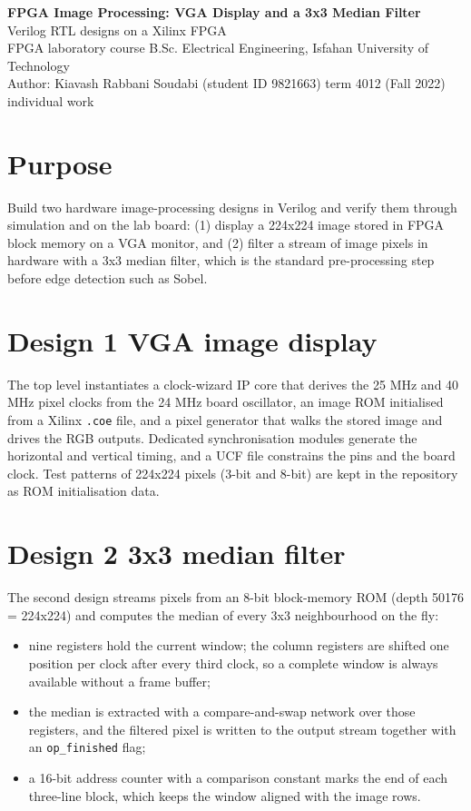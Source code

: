 \documentclass[10pt,a4paper]{article}
\begin{document}
\begin{center}
{\Large\bfseries FPGA Image Processing: VGA Display and a 3x3 Median Filter}\\[2pt]
{\large Verilog RTL designs on a Xilinx FPGA}\\[4pt]
{\small FPGA laboratory course \textendash{} B.Sc. Electrical Engineering, Isfahan University of Technology}\\
{\small Author: Kiavash Rabbani Soudabi (student ID 9821663) \textendash{} term 4012 (Fall 2022) \textendash{} individual work}
\end{center}

\section*{Purpose}
Build two hardware image-processing designs in Verilog and verify them through simulation and on the lab board:
(1) display a 224x224 image stored in FPGA block memory on a VGA monitor, and (2) filter a stream of image pixels in
hardware with a 3x3 median filter, which is the standard pre-processing step before edge detection such as Sobel.

\section*{Design 1 \textendash{} VGA image display}
The top level instantiates a clock-wizard IP core that derives the 25 MHz and 40 MHz pixel clocks from the 24 MHz
board oscillator, an image ROM initialised from a Xilinx \texttt{.coe} file, and a pixel generator that walks the
stored image and drives the RGB outputs. Dedicated synchronisation modules generate the horizontal and vertical
timing, and a UCF file constrains the pins and the board clock. Test patterns of 224x224 pixels (3-bit and 8-bit)
are kept in the repository as ROM initialisation data.

\section*{Design 2 \textendash{} 3x3 median filter}
The second design streams pixels from an 8-bit block-memory ROM (depth 50176 = 224x224) and computes the median of
every 3x3 neighbourhood on the fly:
\begin{itemize}
  \item nine registers hold the current window; the column registers are shifted one position per clock after every
        third clock, so a complete window is always available without a frame buffer;
  \item the median is extracted with a compare-and-swap network over those registers, and the filtered pixel is
        written to the output stream together with an \texttt{op\_finished} flag;
  \item a 16-bit address counter with a comparison constant marks the end of each three-line block, which keeps the
        window aligned with the image rows.
\end{itemize}
\end{document}
